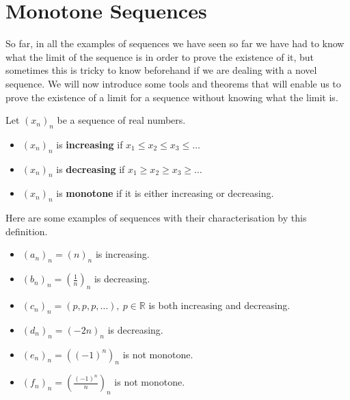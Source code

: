 \documentclass[../real_analysis.tex]{subfiles}
\begin{document}
    \section{Monotone Sequences}\label{sec:monotone-sequences}
        So far, in all the examples of sequences we have seen so far we have had to know what the limit of the sequence is in order to prove the existence of it, but sometimes this is tricky to know beforehand if we are dealing with a novel sequence. We will now introduce some tools and theorems that will enable us to prove the existence of a limit for a sequence without knowing what the limit is.
        \begin{definition}
            Let $(x_n)_n$ be a sequence of real numbers.
            \begin{itemize}
                \item $(x_n)_n$ is \textbf{increasing} if $x_1\leq x_2\leq x_3\leq\dots$
                \item $(x_n)_n$ is \textbf{decreasing} if $x_1\geq x_2\geq x_3\geq\dots$
                \item $(x_n)_n$ is \textbf{monotone} if it is either increasing or decreasing.
            \end{itemize}
        \end{definition}
        \begin{example}
            Here are some examples of sequences with their characterisation by this definition.
            \begin{itemize}
                \item $(a_n)_n=(n)_n$ is increasing.
                \item $(b_n)_n=\left(\frac{1}{n}\right)_n$ is decreasing.
                \item $(c_n)_n=(p, p, p,\dots),\ p\in\mathbb{R}$ is both increasing and decreasing.
                \item $(d_n)_n=(-2n)_n$ is decreasing.
                \item $(e_n)_n=((-1)^n)_n$ is not monotone.
                \item $(f_n)_n=\left(\frac{(-1)^n}{n}\right)_n$ is not monotone.
            \end{itemize}
        \end{example}
\end{document}
